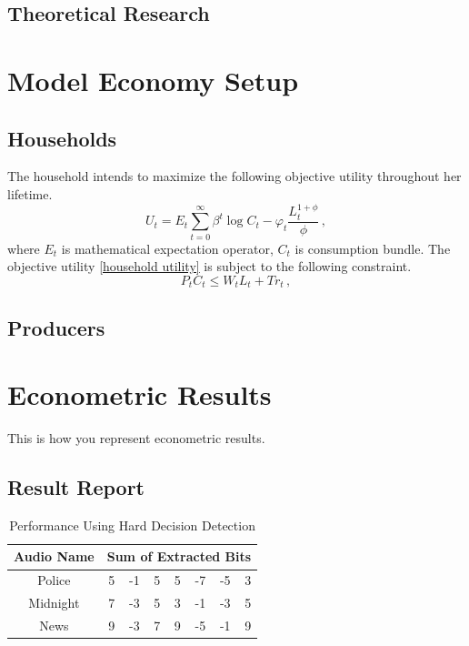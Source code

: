 \documentclass{ZJSUthesis}
\begin{document}
\subsection{Theoretical Research}

\section{Model Economy Setup}

\subsection{Households}
The household intends to maximize the following objective utility throughout her lifetime.
\begin{equation}\label{household utility}
  U_t = E_t\sum_{t=0}^{\infty}\beta^t\log C_t  - \varphi_t\frac{L_t^{1+\phi}}{\phi}\,,
\end{equation}
where $E_t$ is mathematical expectation operator, $C_t$ is consumption bundle. The objective utility \eqref{household utility} is subject to the following constraint.
\begin{equation}\label{budget constraint}
  P_tC_t \leq W_tL_t + Tr_t\,,
\end{equation}

\subsection{Producers}

\section{Econometric Results}
This is how you represent econometric results.

\subsection{Result Report}
\begin{table}[h] \caption{Performance Using Hard Decision Detection} %
\centering     %
\begin{tabular}{c rrrrrrr}  %
\hline%
Audio Name&\multicolumn{7}{c}{Sum of Extracted Bits} \\ [0.5ex]    \hline                %
Police   & 5 & -1 &  5& 5& -7& -5& 3\\  %
Midnight & 7 & -3 &  5& 3& -1& -3& 5\\ News     & 9 & -3 &  7& 9& -5& -1& 9\\[1ex] %
\hline                          %
\end{tabular} \label{tab:hresult} \end{table}
\end{document}
